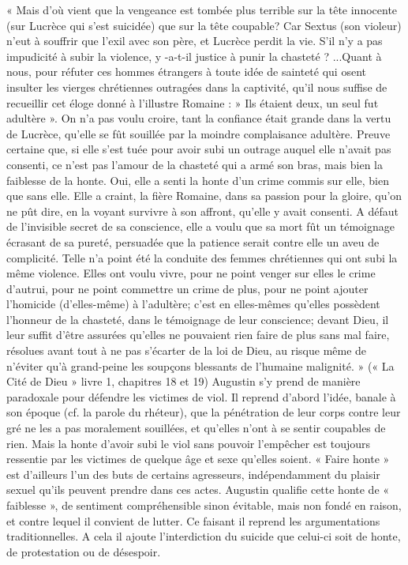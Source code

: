  « Mais d'où vient que la vengeance est tombée plus terrible sur la tête innocente (sur Lucrèce qui s'est suicidée) que sur la tête coupable? Car Sextus (son violeur) n'eut à souffrir que l'exil avec son père, et Lucrèce perdit la vie. S'il n'y a pas impudicité à subir la violence, y -a-t-il justice à punir la chasteté ? ...Quant à nous, pour réfuter ces hommes étrangers à toute idée de sainteté qui osent insulter les vierges chrétiennes outragées dans la captivité, qu'il nous suffise de recueillir cet éloge donné à l'illustre Romaine : » Ils étaient deux, un seul fut adultère ». On n'a pas voulu croire, tant la confiance était grande dans la vertu de Lucrèce, qu'elle se fût souillée par la moindre complaisance adultère. Preuve certaine que, si elle s'est tuée pour avoir subi un outrage auquel elle n'avait pas consenti, ce n'est pas l'amour de la chasteté qui a armé son bras, mais bien la faiblesse de la honte. Oui, elle a senti la honte d'un crime commis sur elle, bien que sans elle. Elle a craint, la fière Romaine, dans sa passion pour la gloire, qu'on ne pût dire, en la voyant survivre à son affront, qu'elle y avait consenti. A défaut de l'invisible secret de sa conscience, elle a voulu que sa mort fût un témoignage écrasant de sa pureté, persuadée que la patience serait contre elle un aveu de complicité. Telle n'a point été la conduite des femmes chrétiennes qui ont subi la même violence. Elles ont voulu vivre, pour ne point venger sur elles le crime d'autrui, pour ne point commettre un crime de plus, pour ne point ajouter l'homicide (d'elles-même) à l'adultère; c'est en elles-mêmes qu'elles possèdent l'honneur de la chasteté, dans le témoignage de leur conscience; devant Dieu, il leur suffit d'être assurées qu'elles ne pouvaient rien faire de plus sans mal faire, résolues avant tout à ne pas s'écarter de la loi de Dieu, au risque même de n'éviter qu'à grand-peine les soupçons blessants de l'humaine malignité. » (« La Cité de Dieu » livre 1, chapitres 18 et 19) 
 Augustin s'y prend de manière paradoxale pour défendre les victimes de viol. Il reprend d'abord l'idée, banale à son époque (cf. la parole du rhéteur), que la pénétration de leur corps contre leur gré ne les a pas moralement souillées, et qu'elles n'ont à se sentir coupables de rien. Mais la honte d'avoir subi le viol sans pouvoir l'empêcher est toujours ressentie par les victimes de quelque âge et sexe qu'elles soient. « Faire honte » est d'ailleurs l'un des buts de certains agresseurs, indépendamment du plaisir sexuel qu'ils peuvent prendre dans ces actes. Augustin qualifie cette honte de « faiblesse », de sentiment compréhensible sinon évitable, mais non fondé en raison, et contre lequel il convient de lutter. Ce faisant il reprend les argumentations traditionnelles. A cela il ajoute l'interdiction du suicide que celui-ci soit de honte, de protestation ou de désespoir. 
